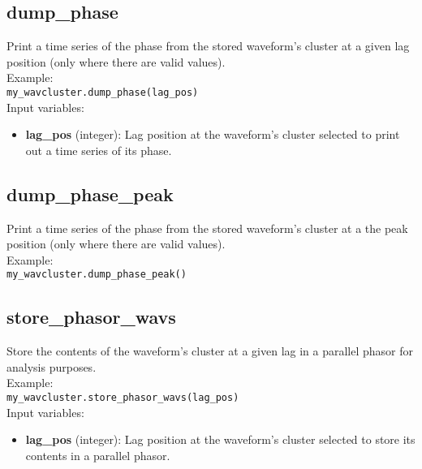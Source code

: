 \subsection{dump\_phase}

Print a time series of the phase from the stored waveform's cluster at a given lag position (only where there are valid values).\\

Example:\\

\texttt{my\_wavcluster.dump\_phase(lag\_pos)}\\

Input variables:
\begin{itemize}
\item {\bf lag\_pos} (integer): Lag position at the waveform's cluster selected to print out a time series of its phase.
\end{itemize}


\subsection{dump\_phase\_peak}

Print a time series of the phase from the stored waveform's cluster at a the peak position (only where there are valid values).\\

Example:\\

\texttt{my\_wavcluster.dump\_phase\_peak()}\\


\subsection{store\_phasor\_wavs}

Store the contents of the waveform's cluster at a given lag in a parallel phasor for analysis purposes.\\

Example:\\

\texttt{my\_wavcluster.store\_phasor\_wavs(lag\_pos)}\\

Input variables:
\begin{itemize}
\item {\bf lag\_pos} (integer): Lag position at the waveform's cluster selected to store its contents in a parallel phasor.
\end{itemize}



